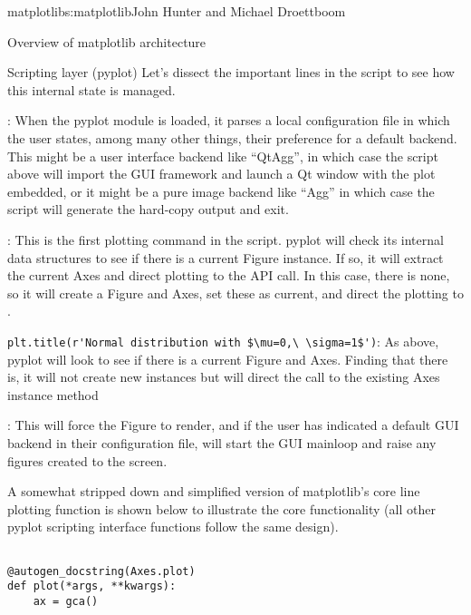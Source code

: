 \begin{aosachapter}{matplotlib}{s:matplotlib}{John Hunter and Michael Droettboom}
\begin{aosasect1}{Overview of matplotlib architecture}
\begin{aosasect2}{Scripting layer (pyplot)}
Let's dissect the important lines in the script to see how this
internal state is managed.

\begin{aosaitemize}

  \item {}: When the pyplot module
    is loaded, it parses a local configuration file in which the user
    states, among many other things, their preference for a default
    backend.  This might be a user interface backend like ``QtAgg'',
    in which case the script above will import the GUI framework and
    launch a Qt window with the plot embedded, or it might be a pure
    image backend like ``Agg'' in which case the script will generate
    the hard-copy output and exit.

  \item {}: This is the first plotting command
    in the script.  pyplot will check its internal data structures to
    see if there is a current Figure instance.  If so, it will extract
    the current Axes and direct plotting to the  API
    call.  In this case, there is none, so it will create a Figure and
    Axes, set these as current, and direct the plotting to
    .

  \item \verb+plt.title(r'Normal distribution with $\mu=0,\ \sigma=1$')+:
    As above, pyplot will look to see if there
    is a current Figure and Axes.  Finding that there is, it will not
    create new instances but will direct the call to the existing Axes
    instance method 

  \item {}: This will force the Figure to render, and
    if the user has indicated a default GUI backend in their
    configuration file, will start the GUI mainloop and raise any
    figures created to the screen.

\end{aosaitemize}

A somewhat stripped down and simplified version of matplotlib's core
line plotting function  is shown below to
illustrate the core functionality (all other pyplot scripting
interface functions follow the same design).

\begin{verbatim}

@autogen_docstring(Axes.plot)
def plot(*args, **kwargs):
    ax = gca()


\end{verbatim}
\end{aosasect2}
\end{aosasect1}
\end{aosachapter}
